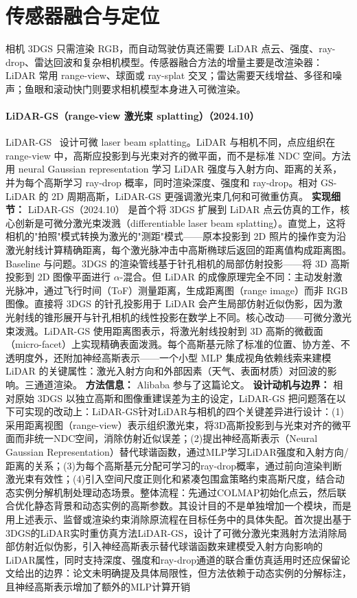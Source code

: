 \section{传感器融合与定位}

相机 3DGS 只需渲染 RGB，而自动驾驶仿真还需要 LiDAR 点云、强度、ray-drop、雷达回波和复杂相机模型。传感器融合方法的增量主要是改渲染器：LiDAR 常用 range-view、球面或 ray-splat 交叉；雷达需要天线增益、多径和噪声；鱼眼和滚动快门则要求相机模型本身进入可微渲染。


\paragraph{LiDAR-GS（range-view 激光束 splatting）（2024.10）}
LiDAR-GS~\cite{2410_05111} 设计可微 laser beam splatting。LiDAR 与相机不同，点应组织在 range-view 中，高斯应投影到与光束对齐的微平面，而不是标准 NDC 空间。方法用 neural Gaussian representation 学习 LiDAR 强度与入射方向、距离的关系，并为每个高斯学习 ray-drop 概率，同时渲染深度、强度和 ray-drop。相对 GS-LiDAR 的 2D 周期高斯，LiDAR-GS 更强调激光束几何和可微重仿真。
\textbf{实现细节：} LiDAR-GS（2024.10） 是首个将 3DGS 扩展到 LiDAR 点云仿真的工作，核心创新是可微分激光束泼溅（differentiable laser beam splatting）。直觉上，这将相机的"拍照"模式转换为激光的"测距"模式——原本投影到 2D 照片的操作变为沿激光射线计算精确距离，每个激光脉冲击中高斯椭球后返回的距离值构成距离图。Baseline 与问题。3DGS 的渲染管线基于针孔相机的局部仿射投影——将 3D 高斯投影到 2D 图像平面进行 $\alpha$-混合。但 LiDAR 的成像原理完全不同：主动发射激光脉冲，通过飞行时间（ToF）测量距离，生成距离图（range image）而非 RGB 图像。直接将 3DGS 的针孔投影用于 LiDAR 会产生局部仿射近似伪影，因为激光射线的锥形展开与针孔相机的线性投影在数学上不同。核心改动——可微分激光束泼溅。LiDAR-GS 使用距离图表示，将激光射线投射到 3D 高斯的微截面（micro-facet）上实现精确表面泼溅。每个高斯基元除了标准的位置、协方差、不透明度外，还附加神经高斯表示——一个小型 MLP 集成视角依赖线索来建模 LiDAR 的关键属性：激光入射方向和外部因素（天气、表面材质）对回波的影响。三通道渲染。
\textbf{方法信息：} Alibaba 参与了这篇论文。
\textbf{设计动机与边界：} 相对原始 3DGS 以独立高斯和图像重建误差为主的设定，LiDAR-GS 把问题落在以下可实现的改动上：LiDAR-GS针对LiDAR与相机的四个关键差异进行设计：(1)采用距离视图（range-view）表示组织激光束，将3D高斯投影到与光束对齐的微平面而非统一NDC空间，消除仿射近似误差；(2)提出神经高斯表示（Neural Gaussian Representation）替代球谐函数，通过MLP学习LiDAR强度和入射方向/距离的关系；(3)为每个高斯基元分配可学习的ray-drop概率，通过前向渲染判断激光束有效性；(4)引入空间尺度正则化和紧凑包围盒策略约束高斯尺度，结合动态实例分解机制处理动态场景。整体流程：先通过COLMAP初始化点云，然后联合优化静态背景和动态实例的高斯参数。其设计目的不是单独增加一个模块，而是用上述表示、监督或渲染约束消除原流程在目标任务中的具体失配。首次提出基于3DGS的LiDAR实时重仿真方法LiDAR-GS，设计了可微分激光束溅射方法消除局部仿射近似伪影，引入神经高斯表示替代球谐函数来建模受入射方向影响的LiDAR属性，同时支持深度、强度和ray-drop通道的联合重仿真适用时还应保留论文给出的边界：论文未明确提及具体局限性，但方法依赖于动态实例的分解标注，且神经高斯表示增加了额外的MLP计算开销
